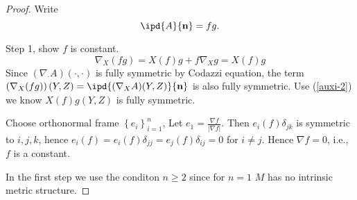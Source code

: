 \begin{proof}
  Write 
  \[
  \ipd{A}{\mathbf{n}}=fg.
  \] 

   Step 1, show $f$ is constant.
   \begin{equation}
     \nabla _{X}(fg)=X(f)g+f\nabla _Xg=X(f)g\label{auxi-2}
   \end{equation}
   Since $(\nabla _{\cdot }A)(\cdot ,\cdot )$ is fully symmetric by Codazzi equation, the term $\left( \nabla _X(fg) \right) (Y,Z)=\ipd{(\nabla _X A)(Y,Z)}{\mathbf{n}}$ is also fully symmetric. Use (\ref{auxi-2}) we know $X(f)g(Y,Z)$ is fully symmetric.

   Choose orthonormal frame $\left\{e_i\right\} _{i=1}^{n}$, Let $e_1=\frac{\nabla f}{|\nabla f|}$. Then $e_i(f)\delta_{jk}$ is symmetric to $i,j,k$, hence $e_i(f)=e_i(f)\delta_{jj}=e_j(f)\delta_{ij}=0$ for $i\neq j$. Hence $\nabla f=0$, i.e., $f$ is a constant.

   In the first step we use the conditon $n\ge 2$ since for $n=1$  $M$ has no intrinsic metric structure.


\end{proof}
